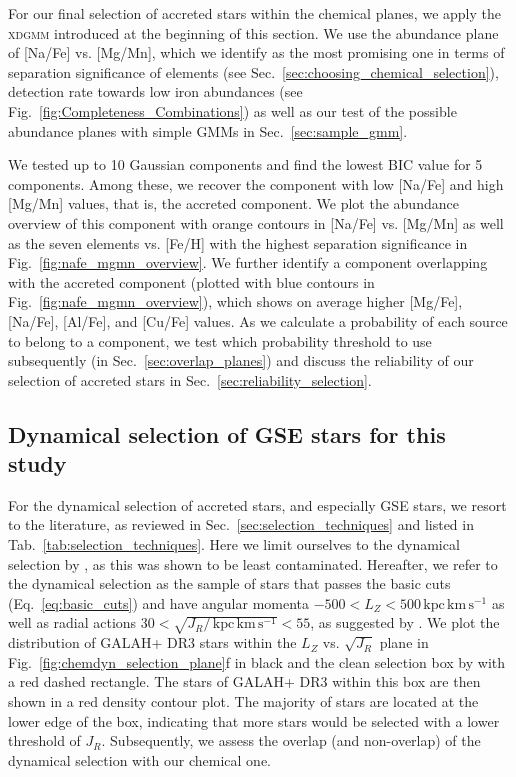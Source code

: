 \documentclass[fleqn,usenatbib]{mnras}
\newcommand{\kpckms}{\,\mathrm{kpc\,km\,s^{-1}}}	%
\begin{document}
For our final selection of accreted stars within the chemical planes, we apply the \textsc{xdgmm} introduced at the beginning of this section. We use the abundance plane of [Na/Fe] vs. [Mg/Mn], which we identify as the most promising one in terms of separation significance of elements (see Sec.~\ref{sec:choosing_chemical_selection}), detection rate towards low iron abundances (see Fig.~\ref{fig:Completeness_Combinations}) as well as our test of the possible abundance planes with simple GMMs in Sec.~\ref{sec:sample_gmm}.

We tested up to 10 Gaussian components and find the lowest BIC value for 5 components. Among these, we recover the component with low [Na/Fe] and high [Mg/Mn] values, that is, the accreted component. We plot the abundance overview of this component with orange contours in [Na/Fe] vs. [Mg/Mn] as well as the seven elements vs. [Fe/H] with the highest separation significance in Fig.~\ref{fig:nafe_mgmn_overview}. We further identify a component overlapping with the accreted component (plotted with blue contours in Fig.~\ref{fig:nafe_mgmn_overview}), which shows on average higher [Mg/Fe], [Na/Fe], [Al/Fe], and [Cu/Fe] values. As we calculate a probability of each source to belong to a component, we test which probability threshold to use subsequently (in Sec.~\ref{sec:overlap_planes}) and discuss the reliability of our selection of accreted stars in Sec.~\ref{sec:reliability_selection}.

\subsection{Dynamical selection of GSE stars for this study} \label{sec:dynamical_selection}

For the dynamical selection of accreted stars, and especially GSE stars, we resort to the literature, as reviewed in Sec.~\ref{sec:selection_techniques} and listed in Tab.~\ref{tab:selection_techniques}. Here we limit ourselves to the dynamical selection by \citet{Feuillet2021}, as this was shown to be least contaminated. Hereafter, we refer to the dynamical selection as the sample of stars that passes the basic cuts (Eq.~\ref{eq:basic_cuts}) and have angular momenta $-500 < L_Z < 500 \kpckms$ as well as radial actions $30 < \sqrt{J_R / \kpckms} < 55$, as suggested by \citet{Feuillet2021}. We plot the distribution of GALAH+ DR3 stars within the $L_Z$ vs. $\sqrt{J_R}$ plane in Fig.~\ref{fig:chemdyn_selection_plane}f in black and the clean selection box by \citet{Feuillet2021} with a red dashed rectangle. The stars of GALAH+ DR3 within this box are then shown in a red density contour plot. The majority of stars are located at the lower edge of the box, indicating that more stars would be selected with a lower threshold of $J_R$. Subsequently, we assess the overlap (and non-overlap) of the dynamical selection with our chemical one.
\end{document}
